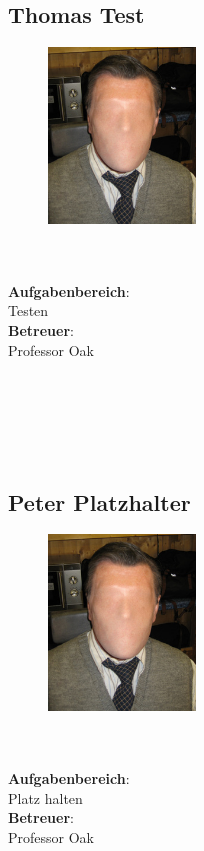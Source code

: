 \subsection*{Thomas Test}
\begin{figure}
\begin{center}
  \includegraphics[width=0.35\textwidth]{fig/face}
\end{center}
\end{figure}
\mbox{}\\
\mbox{}\\
\textbf{Aufgabenbereich}:\\
Testen\\
\textbf{Betreuer}:\\
Professor Oak
\mbox{}\\
\mbox{}\\
\mbox{}\\
\mbox{}\\
\mbox{}\\
\mbox{}\\

\subsection*{Peter Platzhalter}
\begin{figure}
\begin{center}
  \includegraphics[width=0.35\textwidth]{fig/face}
\end{center}
\end{figure}
\mbox{}\\
\mbox{}\\
\textbf{Aufgabenbereich}:\\
Platz halten\\
\textbf{Betreuer}:\\
Professor Oak
\mbox{}\\
\mbox{}\\
\mbox{}\\
\mbox{}\\
\mbox{}\\
\newpage
